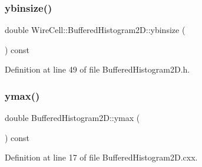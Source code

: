 \subsubsection{\texorpdfstring{ybinsize()}{ybinsize()}}
{\footnotesize\ttfamily double Wire\+Cell\+::\+Buffered\+Histogram2\+D\+::ybinsize (\begin{DoxyParamCaption}{ }\end{DoxyParamCaption}) const\hspace{0.3cm}{\ttfamily [inline]}}



Definition at line 49 of file Buffered\+Histogram2\+D.\+h.

\mbox{\label{class_wire_cell_1_1_buffered_histogram2_d_af0286addd8f7124fa4def025db6038d4}} 
\subsubsection{\texorpdfstring{ymax()}{ymax()}}
{\footnotesize\ttfamily double Buffered\+Histogram2\+D\+::ymax (\begin{DoxyParamCaption}{ }\end{DoxyParamCaption}) const}



Definition at line 17 of file Buffered\+Histogram2\+D.\+cxx.

